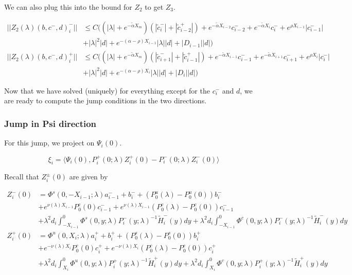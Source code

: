 \documentclass[12pt]{article}
\begin{document}
We can also plug this into the bound for $Z_2$ to get $Z_3$.

\begin{align*}
||Z_2(\lambda)(b,c^-,d)_i^-|| &\leq C ( (|\lambda| + e^{-\tilde{\alpha}X_m})(|\tilde{c}_i^-| + |\tilde{c}_{i-2}^+|) + e^{-\tilde{\alpha} X_{i-2}} c_{i-2}^- + e^{-\tilde{\alpha} X_i} c_i^- + e^{\rho X_{i-1}}|c_{i-1}^-| \\ 
&+ |\lambda|^2 |d| + e^{-(\alpha - \rho)X_{i-1}}|\lambda||d| + |D_{i-1}||d| ) \\
||Z_2(\lambda)(b,c^-,d)_i^+|| &\leq C \Big( (|\lambda| + e^{-\tilde{\alpha}X_m})(|\tilde{c}_{i+1}^-| + |\tilde{c}_{i-1}^+|) + e^{-\tilde{\alpha} X_{i-1}} c_{i-1}^- + e^{-\tilde{\alpha} X_{i+1}} c_{i+1}^- + e^{\rho X_i} |c_i^-| \\
&+ |\lambda|^2 |d| + e^{-(\alpha - \rho)X_i}|\lambda||d| + |D_i||d| \Big)
\end{align*}

Now that we have solved (uniquely) for everything except for the $c_i^-$ and $d$, we are ready to compute the jump conditions in the two directions.

\subsubsection*{Jump in Psi direction}

For this jump, we project on $\Psi_i(0)$.

\[
\xi_i = \langle \Psi_i(0), P_i^+(0; \lambda) Z_i^+(0) - P_i^-(0; \lambda) Z_i^-(0) \rangle
\]

Recall that $Z_i^\pm(0)$ are given by

\begin{align*}
Z_i^-(0) &= \Phi^s(0, -X_{i-1}; \lambda) a_{i-1}^- + b_i^- + (P_0^u(\lambda) - P_0^u(0))b_i^- \\
&+ e^{\nu(\lambda) X_{i-1}} P_0^c(0) c_{i-1}^- + e^{\nu(\lambda) X_{i-1}} (P_0^c(\lambda) - P_0^c(0))c_{i-1}^- \\
&+ \lambda^2 d_i \int_{-X_{i-1}}^0 \Phi^s(0, y; \lambda) P_i^-(y; \lambda)^{-1} \tilde{H}_i^-(y) dy 
+ \lambda^2 d_i \int_{-X_{i-1}}^0 \Phi^c(0, y; \lambda) P_i^-(y; \lambda)^{-1} \tilde{H}_i^-(y) dy  \\ 
Z_i^+(0) &= \Phi^u(0, X_i; \lambda) a_i^+ + b_i^+ + (P_0^s(\lambda) - P_0^s(0)) b_i^+ \\
&+ e^{-\nu(\lambda)X_i} P_0^c(0) c_i^+ + e^{-\nu(\lambda)X_i} (P_0^c(\lambda) - P_0^c(0))c_i^+ \\
&+ \lambda^2 d_i \int_{X_i}^0 \Phi^u(0, y; \lambda) P_i^+(y; \lambda)^{-1} \tilde{H}_i^+(y) dy 
+ \lambda^2 d_i \int_{X_i}^0 \Phi^c(0, y; \lambda) P_i^+(y; \lambda)^{-1} \tilde{H}_i^+(y) dy \\
\end{align*}
\end{document}
